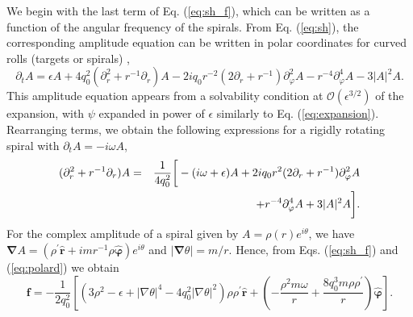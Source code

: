 \documentclass[preprint,prx,floatfix]{revtex4-1}
\begin{document}
We begin with the last term of Eq. (\ref{eq:sh_f}), which can be written as a function of the angular frequency of the spirals. From Eq. (\ref{eq:sh}), the corresponding amplitude equation \cite{manneville1990dissipative,hoyle2006pattern} can be written in polar coordinates for curved rolls (targets or spirals) \cite{vitral2019role,korzinov1993origin},
\begin{equation}
\partial_{t} A = \epsilon A + 4q_0^2(\partial_r^2+r^{-1}\partial_r)A - 2i q_0 r^{-2} (2 \partial_r + r^{-1})\partial_\varphi^2A - r^{-4}\partial_\varphi^4A-3 |A|^{2} A.
\label{eq:amp}
\end{equation}
This amplitude equation appears from a solvability condition at $\mathcal{O}(\epsilon^{3/2})$ of the expansion, with $\psi$ expanded in power of $\epsilon$ similarly to Eq. (\ref{eq:expansion}). Rearranging terms, we obtain the following expressions for a rigidly rotating spiral with $\partial_{t} A = - i \omega A$,
\begin{eqnarray}
\nonumber
(\partial_r^2+r^{-1}\partial_r)A &=& \frac{1}{4 q_0^2}\bigg[-(i \omega + \epsilon)A 
+2i q_0 r^2(2\partial_r+r^{-1})\partial^2_\varphi A \\ %
&& \hspace{9mm} + r^{-4}\partial^4_\varphi A + 3|A|^{2} A \bigg].
\label{eq:polard}
\end{eqnarray}
For the complex amplitude of a spiral given by $A = \rho(r)e^{i\theta}$, we have $\bm{\nabla} A = (\rho^\prime\hat{\bm{r}} + i m r^{-1}\rho \hat{\bm{\varphi}})e^{i\theta}$ and $|\bm{\nabla}\theta| = m/r$. Hence, from Eqs. (\ref{eq:sh_f}) and (\ref{eq:polard}) we obtain
\begin{equation}
\mathbf{f} = - \frac{1}{2 q_0^2}  \left[ \left( 3\rho^{2} - \epsilon + |\nabla\theta|^4 - 4q_0^2|\nabla\theta|^2\right)\rho\rho^{\prime} \hat{\bm{r}} + \left(-\frac{\rho^2  m \omega}{r} + \frac{8q_0^3 m \rho\rho^\prime}{r}\right) \hat{\bm{\varphi}} \right].
\label{eq:finalf}
\end{equation}
\end{document}
